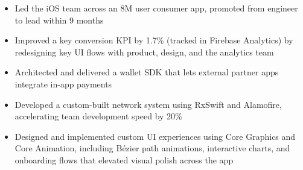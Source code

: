 \begin{itemize}
    \item Led the iOS team across an 8M user consumer app, promoted from engineer to lead within 9 months
    \item Improved a key conversion KPI by 1.7\% (tracked in Firebase Analytics) by redesigning key UI flows with product, design, and the analytics team
    \item Architected and delivered a wallet SDK that lets external partner apps integrate in-app payments
    \item Developed a custom-built network system using RxSwift and Alamofire, accelerating team development speed by 20\%
    \item Designed and implemented custom UI experiences using Core Graphics and Core Animation, including Bézier path animations, interactive charts, and onboarding flows that elevated visual polish across the app
\end{itemize}